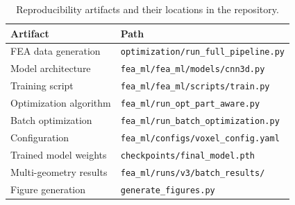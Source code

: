 \documentclass[11pt]{article}
\theoremstyle{plain}
\theoremstyle{definition}
\theoremstyle{remark}
\begin{document}
\begin{table}[h]
\centering
\caption{Reproducibility artifacts and their locations in the repository.}
\label{tab:reproducibility}
\small
\begin{tabular}{@{}p{5.5cm}p{7cm}@{}}
\toprule
\textbf{Artifact} & \textbf{Path} \\
\midrule
FEA data generation & \texttt{optimization/run\_full\_pipeline.py} \\
Model architecture & \texttt{fea\_ml/fea\_ml/models/cnn3d.py} \\
Training script & \texttt{fea\_ml/fea\_ml/scripts/train.py} \\
Optimization algorithm & \texttt{fea\_ml/run\_opt\_part\_aware.py} \\
Batch optimization & \texttt{fea\_ml/run\_batch\_optimization.py} \\
Configuration & \texttt{fea\_ml/configs/voxel\_config.yaml} \\
Trained model weights & \texttt{checkpoints/final\_model.pth} \\
Multi-geometry results & \texttt{fea\_ml/runs/v3/batch\_results/} \\
Figure generation & \texttt{generate\_figures.py} \\
\bottomrule
\end{tabular}
\end{table}
\end{document}
